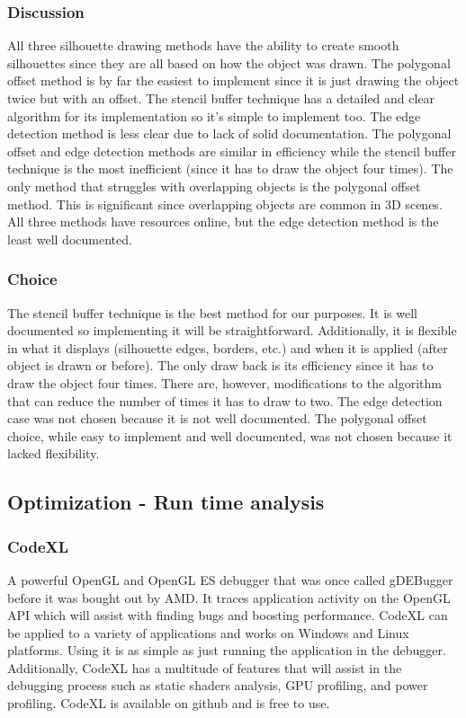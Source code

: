\documentclass[10pt,journal,compsoc,draftclsnofoot]{IEEEtran}
\begin{document}
\newpage

\subsubsection{Discussion}
All three silhouette drawing methods have the ability to create smooth silhouettes since they are all based on how the object was drawn.
The polygonal offset method is by far the easiest to implement since it is just drawing the object twice but with an offset.
The stencil buffer technique has a detailed and clear algorithm for its implementation so it's simple to implement too.
The edge detection method is less clear due to lack of solid documentation.
The polygonal offset and edge detection methods are similar in efficiency while the stencil buffer technique is the most inefficient (since it has to draw the object four times).
The only method that struggles with overlapping objects is the polygonal offset method. 
This is significant since overlapping objects are common in 3D scenes.
All three methods have resources online, but the edge detection method is the least well documented.

\subsubsection{Choice}
The stencil buffer technique is the best method for our purposes.
It is well documented so implementing it will be straightforward.
Additionally, it is flexible in what it displays (silhouette edges, borders, etc.) and when it is applied (after object is drawn or before). 
The only draw back is its efficiency since it has to draw the object four times.
There are, however, modifications to the algorithm that can reduce the number of times it has to draw to two. \cite{siledges}
The edge detection case was not chosen because it is not well documented.
The polygonal offset choice, while easy to implement and well documented, was not chosen because it lacked flexibility.

\newpage

\subsection{Optimization - Run time analysis}

\subsubsection{CodeXL}
A powerful OpenGL and OpenGL ES debugger that was once called gDEBugger before it was bought out by AMD.
It traces application activity on the OpenGL API which will assist with finding bugs and boosting performance.
CodeXL can be applied to a variety of applications and works on Windows and Linux platforms.
Using it is as simple as just running the application in the debugger.
Additionally, CodeXL has a multitude of features that will assist in the debugging process such as static shaders analysis, GPU profiling, and power profiling. \cite{codexl}
CodeXL is available on github and is free to use.
\end{document}
